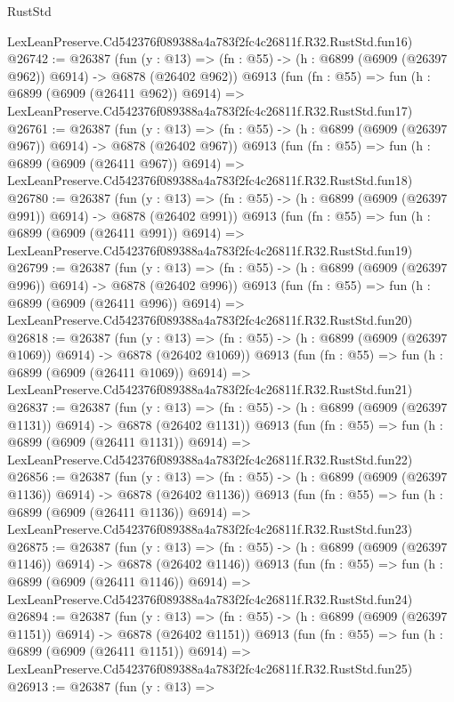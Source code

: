 \begin{lexlean}{RustStd}
\begin{coremodule}
    LexLeanPreserve.Cd542376f089388a4a783f2fc4c26811f.R32.RustStd.fun16)
@26742 := @26387
    (fun (y : @13) => (fn : @55) -> (h : @6899 (@6909 (@26397 @962)) @6914) -> @6878 (@26402 @962))
    @6913
    (fun (fn : @55) =>
    fun (h : @6899 (@6909 (@26411 @962)) @6914) =>
    LexLeanPreserve.Cd542376f089388a4a783f2fc4c26811f.R32.RustStd.fun17)
@26761 := @26387
    (fun (y : @13) => (fn : @55) -> (h : @6899 (@6909 (@26397 @967)) @6914) -> @6878 (@26402 @967))
    @6913
    (fun (fn : @55) =>
    fun (h : @6899 (@6909 (@26411 @967)) @6914) =>
    LexLeanPreserve.Cd542376f089388a4a783f2fc4c26811f.R32.RustStd.fun18)
@26780 := @26387
    (fun (y : @13) => (fn : @55) -> (h : @6899 (@6909 (@26397 @991)) @6914) -> @6878 (@26402 @991))
    @6913
    (fun (fn : @55) =>
    fun (h : @6899 (@6909 (@26411 @991)) @6914) =>
    LexLeanPreserve.Cd542376f089388a4a783f2fc4c26811f.R32.RustStd.fun19)
@26799 := @26387
    (fun (y : @13) => (fn : @55) -> (h : @6899 (@6909 (@26397 @996)) @6914) -> @6878 (@26402 @996))
    @6913
    (fun (fn : @55) =>
    fun (h : @6899 (@6909 (@26411 @996)) @6914) =>
    LexLeanPreserve.Cd542376f089388a4a783f2fc4c26811f.R32.RustStd.fun20)
@26818 := @26387
    (fun (y : @13) =>
    (fn : @55) -> (h : @6899 (@6909 (@26397 @1069)) @6914) -> @6878 (@26402 @1069))
    @6913
    (fun (fn : @55) =>
    fun (h : @6899 (@6909 (@26411 @1069)) @6914) =>
    LexLeanPreserve.Cd542376f089388a4a783f2fc4c26811f.R32.RustStd.fun21)
@26837 := @26387
    (fun (y : @13) =>
    (fn : @55) -> (h : @6899 (@6909 (@26397 @1131)) @6914) -> @6878 (@26402 @1131))
    @6913
    (fun (fn : @55) =>
    fun (h : @6899 (@6909 (@26411 @1131)) @6914) =>
    LexLeanPreserve.Cd542376f089388a4a783f2fc4c26811f.R32.RustStd.fun22)
@26856 := @26387
    (fun (y : @13) =>
    (fn : @55) -> (h : @6899 (@6909 (@26397 @1136)) @6914) -> @6878 (@26402 @1136))
    @6913
    (fun (fn : @55) =>
    fun (h : @6899 (@6909 (@26411 @1136)) @6914) =>
    LexLeanPreserve.Cd542376f089388a4a783f2fc4c26811f.R32.RustStd.fun23)
@26875 := @26387
    (fun (y : @13) =>
    (fn : @55) -> (h : @6899 (@6909 (@26397 @1146)) @6914) -> @6878 (@26402 @1146))
    @6913
    (fun (fn : @55) =>
    fun (h : @6899 (@6909 (@26411 @1146)) @6914) =>
    LexLeanPreserve.Cd542376f089388a4a783f2fc4c26811f.R32.RustStd.fun24)
@26894 := @26387
    (fun (y : @13) =>
    (fn : @55) -> (h : @6899 (@6909 (@26397 @1151)) @6914) -> @6878 (@26402 @1151))
    @6913
    (fun (fn : @55) =>
    fun (h : @6899 (@6909 (@26411 @1151)) @6914) =>
    LexLeanPreserve.Cd542376f089388a4a783f2fc4c26811f.R32.RustStd.fun25)
@26913 := @26387
    (fun (y : @13) =>

\end{coremodule}
\end{lexlean}
